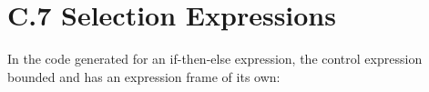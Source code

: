 \begin{center}
\tabletail{}
\tablelasttail{}
\begin{supertabular}{|m{1.9073598in}|m{2.75596in}|}

\end{supertabular}
\end{center}


\section[C.7 Selection Expressions]{C.7 Selection Expressions}

In the code generated for an if-then-else expression, the control
expression bounded and has an expression frame of its own:

